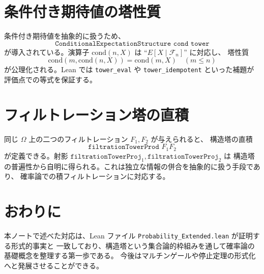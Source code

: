 \documentclass[12pt]{ltjsarticle}
\begin{document}
\section{条件付き期待値の塔性質}
条件付き期待値を抽象的に扱うため、
\[
\texttt{ConditionalExpectationStructure cond tower}
\]
が導入されている。演算子 $\mathrm{cond}(n, X)$ は ``$E[X \mid \mathcal{F}_n]$'' に対応し、
塔性質
\[
\mathrm{cond}(m, \mathrm{cond}(n, X)) = \mathrm{cond}(m, X) \quad (m \le n)
\]
が公理化される。Lean では \texttt{tower\_eval} や \texttt{tower\_idempotent} といった補題が
評価点での等式を保証する。

\section{フィルトレーション塔の直積}
同じ $\Omega$ 上の二つのフィルトレーション $F_1, F_2$ が与えられると、
構造塔の直積
\[
\texttt{filtrationTowerProd }F_1 F_2
\]
が定義できる。射影
$\texttt{filtrationTowerProj}_1, \texttt{filtrationTowerProj}_2$ は
構造塔の普遍性から自明に得られる。これは独立な情報の併合を抽象的に扱う手段であり、
確率論での積フィルトレーションに対応する。

\section*{おわりに}
本ノートで述べた対応は、Lean ファイル \texttt{Probability\_Extended.lean} が証明する形式的事実と
一致しており、構造塔という集合論的枠組みを通して確率論の基礎概念を整理する第一歩である。
今後はマルチンゲールや停止定理の形式化へと発展させることができる。
\end{document}

